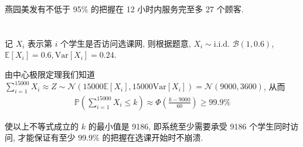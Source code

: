 \documentclass[8pt]{article}
\theoremstyle{compact}
\def\le{\leqslant}
\def\ge{\geqslant}
\def\P#1{\mathbb{P}\left({#1}\right)}
\def\E#1{\mathbb{E}\left[{#1}\right]}
\def\Var#1{\text{Var}\left[{#1}\right]}
\begin{document}
燕园美发有不低于 95\% 的把握在 12 小时内服务完至多 27 个顾客.
\section{}
记 $X_i$ 表示第 $i$ 个学生是否访问选课网, 则根据题意, $X_i \sim \text{i.i.d. } \mathcal B(1, 0.6)$, $\E{X_i} = 0.6, \Var{X_i} = 0.24$.

由中心极限定理我们知道 $\sum\limits_{i=1}^{15000}X_i \approx Z \sim \mathcal N(15000\E{X_i}, 15000\Var{X_i}) = \mathcal N(9000, 3600)$, 从而
\begin{equation*}
	\begin{split}
		\P{\sum\limits_{i=1}^{15000}X_i \le k} \approx \Phi\left(\frac{k-9000}{60}\right) \ge 99.9\%
	\end{split}
\end{equation*}

使以上不等式成立的 $k$ 的最小值是 9186, 即系统至少需要承受 9186 个学生同时访问, 才能保证有至少 99.9\% 的把握在选课开始时不崩溃.
\end{document}
